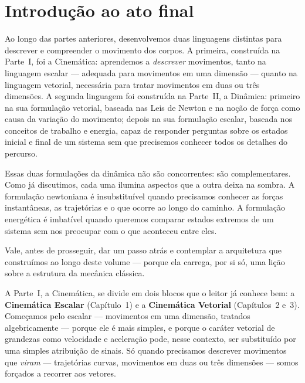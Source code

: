
\chapter*{Introdução ao ato final}

 
Ao longo das partes anteriores, desenvolvemos duas linguagens
distintas para descrever e compreender o movimento dos corpos.
A primeira, construída na Parte~I, foi a Cinemática: aprendemos a
\emph{descrever} movimentos, tanto na linguagem escalar ---
adequada para movimentos em uma dimensão --- quanto na linguagem
vetorial, necessária para tratar movimentos em duas ou três
dimensões. A segunda linguagem foi construída na Parte~II, a
Dinâmica: primeiro na sua formulação vetorial, baseada nas Leis
de Newton e na noção de força como causa da variação do movimento;
depois na sua formulação escalar, baseada nos conceitos de trabalho
e energia, capaz de responder perguntas sobre os estados inicial e
final de um sistema sem que precisemos conhecer todos os detalhes
do percurso.
 
Essas duas formulações da dinâmica não são concorrentes: são
complementares. Como já discutimos, cada uma ilumina aspectos que
a outra deixa na sombra. A formulação newtoniana é insubstituível
quando precisamos conhecer as forças instantâneas, as trajetórias e
o que ocorre ao longo do caminho. A formulação energética é
imbatível quando queremos comparar estados extremos de um sistema
sem nos preocupar com o que aconteceu entre eles.
 
 
Vale, antes de prosseguir, dar um passo atrás e contemplar a
arquitetura que construímos ao longo deste volume --- porque ela
carrega, por si só, uma lição sobre a estrutura da mecânica
clássica.
 
A Parte~I, a Cinemática, se divide em dois blocos que o leitor
já conhece bem: a \textbf{Cinemática Escalar} (Capítulo~1) e a
\textbf{Cinemática Vetorial} (Capítulos~2 e~3). Começamos pelo
escalar --- movimentos em uma dimensão, tratados algebricamente
--- porque ele é mais simples, e porque o caráter vetorial de
grandezas como velocidade e aceleração pode, nesse contexto, ser
substituído por uma simples atribuição de sinais. Só quando
precisamos descrever movimentos que \emph{viram} --- trajetórias
curvas, movimentos em duas ou três dimensões --- somos forçados a
recorrer aos vetores.
 
